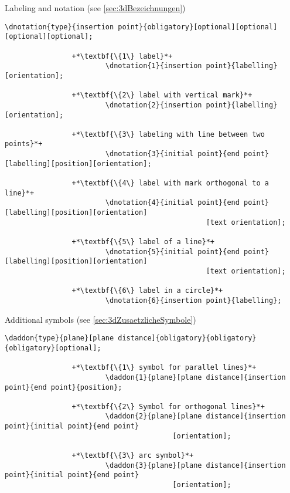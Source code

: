 \documentclass[%
  a4paper,
  BCOR20mm,
  pointlessnumbers,
  twoside,
  halfparskip,
  openright,
]{scrreprt}
\begin{document}
Labeling and notation (see \ref{sec:3dBezeichnungen})

\begin{lstlisting}[emph={dnotation},backgroundcolor=\color{white}]
		\dnotation{type}{insertion point}{obligatory}[optional][optional][optional][optional];
		
				+*\textbf{\{1\} label}*+
						\dnotation{1}{insertion point}{labelling}[orientation];
						
				+*\textbf{\{2\} label with vertical mark}*+
						\dnotation{2}{insertion point}{labelling}[orientation];
						
				+*\textbf{\{3\} labeling with line between two points}*+
						\dnotation{3}{initial point}{end point}[labelling][position][orientation];
						
				+*\textbf{\{4\} label with mark orthogonal to a line}*+
						\dnotation{4}{initial point}{end point}[labelling][position][orientation]
												[text orientation];
						
				+*\textbf{\{5\} label of a line}*+
						\dnotation{5}{initial point}{end point}[labelling][position][orientation]
												[text orientation];
						
				+*\textbf{\{6\} label in a circle}*+
						\dnotation{6}{insertion point}{labelling};
\end{lstlisting}\vspace{-10mm}

Additional symbols (see \ref{sec:3dZusaetzlicheSymbole})

\begin{lstlisting}[emph={daddon},backgroundcolor=\color{white}]
		\daddon{type}{plane}[plane distance]{obligatory}{obligatory}{obligatory}[optional];
		
				+*\textbf{\{1\} symbol for parallel lines}*+
						\daddon{1}{plane}[plane distance]{insertion point}{end point}{position};
						
				+*\textbf{\{2\} Symbol for orthogonal lines}*+
						\daddon{2}{plane}[plane distance]{insertion point}{initial point}{end point}
										[orientation];
				
				+*\textbf{\{3\} arc symbol}*+
						\daddon{3}{plane}[plane distance]{insertion point}{initial point}{end point}
										[orientation];
\end{lstlisting}\vspace{-10mm}
\end{document}
